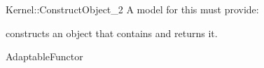 \begin{ccRefFunctionObjectConcept}{Kernel::ConstructObject_2}
A model for this must provide:


{constructs an object that contains  and returns it.}

\ccRefines
AdaptableFunctor

\ccSeeAlso
{} \\
 \\
 \\
 \\
 \\
  \\

\end{ccRefFunctionObjectConcept}
